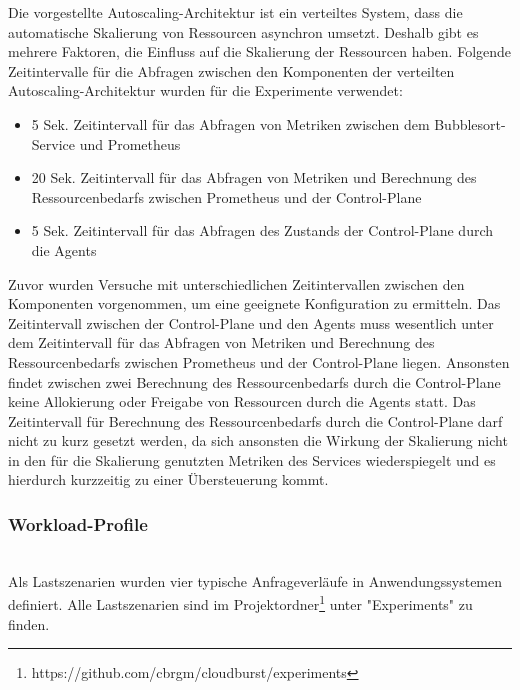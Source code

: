 \documentclass[runningheads]{llncs}
\begin{document}
Die vorgestellte Autoscaling-Architektur ist ein verteiltes System, dass die automatische Skalierung von Ressourcen asynchron umsetzt. Deshalb gibt es mehrere Faktoren, die Einfluss auf die Skalierung der Ressourcen haben. Folgende Zeitintervalle für die Abfragen zwischen den Komponenten der verteilten Autoscaling-Architektur wurden für die Experimente verwendet: 

 \begin{itemize}
	\item  5 Sek. Zeitintervall für das Abfragen von Metriken zwischen dem Bubblesort-Service und Prometheus \\
	\item  20 Sek. Zeitintervall für das Abfragen von Metriken und Berechnung des Ressourcenbedarfs zwischen Prometheus und der Control-Plane \\
	\item  5 Sek. Zeitintervall für das Abfragen des Zustands der Control-Plane durch die Agents
\end{itemize}

Zuvor wurden Versuche mit unterschiedlichen Zeitintervallen zwischen den Komponenten vorgenommen, um eine geeignete Konfiguration zu ermitteln.
Das Zeitintervall zwischen der Control-Plane und den Agents muss wesentlich unter dem Zeitintervall für das Abfragen von Metriken und Berechnung des Ressourcenbedarfs zwischen Prometheus und der Control-Plane liegen. Ansonsten findet zwischen zwei Berechnung des Ressourcenbedarfs durch die Control-Plane keine Allokierung oder Freigabe von Ressourcen durch die Agents statt. Das Zeitintervall für Berechnung des Ressourcenbedarfs durch die Control-Plane darf nicht zu kurz gesetzt werden, da sich ansonsten die Wirkung der Skalierung nicht in den für die Skalierung genutzten Metriken des Services wiederspiegelt und es hierdurch kurzzeitig zu einer Übersteuerung kommt. \\
\newpage

\subsubsection{Workload-Profile} \hfill\\

Als Lastszenarien wurden vier typische Anfrageverläufe in Anwendungssystemen definiert. Alle Lastszenarien sind im Projektordner\footnote{https://github.com/cbrgm/cloudburst/experiments} unter "Experiments" zu finden.
\end{document}
